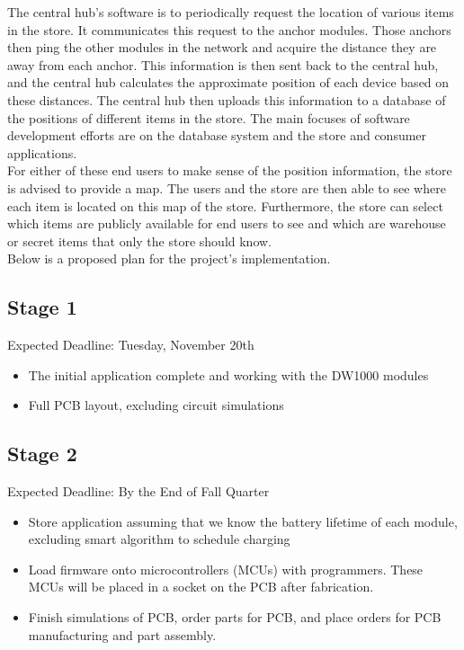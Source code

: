 \documentclass{article}
\begin{document}
The central hub's software is to periodically request the location of various items in the store.
It communicates this request to the anchor modules.
Those anchors then ping the other modules in the network and acquire the distance they are away from each anchor.
This information is then sent back to the central hub, and the central hub calculates the approximate position of each device based on these distances.
The central hub then uploads this information to a database of the positions of different items in the store.
The main focuses of software development efforts are on the database system and the store and consumer applications.\\

For either of these end users to make sense of the position information, the store is advised to provide a map.
The users and the store are then able to see where each item is located on this map of the store.
Furthermore, the store can select which items are publicly available for end users to see and which are warehouse or secret items that only the store should know. \\

Below is a proposed plan for the project's implementation.
\subsection{Stage 1}
Expected Deadline: Tuesday, November 20th
\begin{itemize}
\item The initial application complete and working with the DW1000 modules
\item Full PCB layout, excluding circuit simulations
\end{itemize}

\subsection{Stage 2}
Expected Deadline: By the End of Fall Quarter \\
\begin{itemize}
\item Store application assuming that we know the battery lifetime of each module, excluding smart algorithm to schedule charging
\item Load firmware onto microcontrollers (MCUs) with programmers. These MCUs will be placed in a socket on the PCB after fabrication.
\item Finish simulations of PCB, order parts for PCB, and place orders for PCB manufacturing and part assembly.
\end{itemize}
\end{document}
